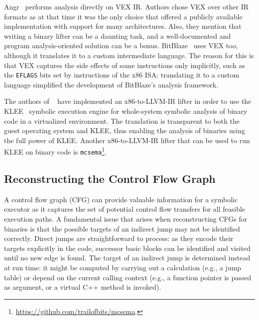 {\sc Angr}~\cite{ANGR-SSP16} performs analysis directly on VEX IR. Authors chose VEX over other IR formats as at that time it was the only choice that offered a publicly available implementation with support for many architectures. Also, they mention that writing a binary lifter can be a daunting task, and a well-documented and program analysis-oriented solution can be a bonus. {\sc BitBlaze}~\cite{BITBLAZE-ICISS08} uses VEX too, although it translates it to a custom intermediate language. The reason for this is that VEX captures the side effects of some instructions only implicitly, such as the {\tt EFLAGS} bits set by instructions of the x86 ISA: translating it to a custom language simplified the development of {\sc BitBlaze}'s analysis framework.

The authors of {\sc \stwoe}~\cite{CKC-TOCS12} have implemented an x86-to-LLVM-IR lifter in order to use the {\sc KLEE}~\cite{KLEE-OSDI08} symbolic execution engine for whole-system symbolic analysis of binary code in a virtualized environment. The translation is transparent to both the guest operating system and KLEE, thus enabling the analysis of binaries using the full power of {\sc KLEE}. Another x86-to-LLVM-IR lifter that can be used to run {\sc KLEE} on binary code is {\tt mcsema}\footnote{\url{https://github.com/trailofbits/mcsema}.}.

\subsection{Reconstructing the Control Flow Graph}

A control flow graph (CFG) can provide valuable information for a symbolic executor as it captures the set of potential control flow transfers for all feasible execution paths. A fundamental issue that arises when reconstructing CFGs for binaries is that the possible targets of an indirect jump may not be identified correctly. Direct jumps are straightforward to process: as they encode their targets explicitly in the code, successor basic blocks can be identified and visited until no new edge is found. The target of an indirect jump is determined instead at run time: it might be computed by carrying out a calculation (e.g., a jump table) or depend on the current calling context (e.g., a function pointer is passed as argument, or a virtual C++ method is invoked). %


